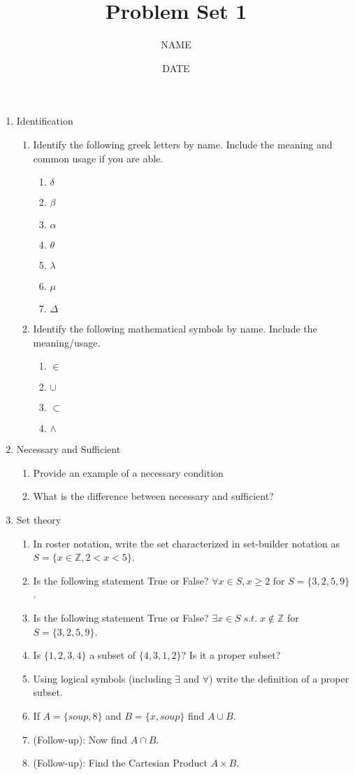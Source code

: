 \documentclass[12pt,thmsa]{article}
\title{Problem Set 1}
\author{NAME}
\date{DATE}
\begin{document}
\maketitle


\begin{enumerate}
\item Identification
\begin{enumerate}
\item Identify the following greek letters by name. Include the meaning and common usage if you are able. 
\begin{enumerate}
\item $\delta$
\item $\beta$
\item $\alpha$
\item $\theta$
\item $\lambda$
\item $\mu$
\item $\Delta$
\end{enumerate}

\item Identify the following mathematical symbols by name. Include the meaning/usage. 
\begin{enumerate}
\item $\in$
\item $\cup$
\item $\subset$
\item $\wedge$
\end{enumerate}
\end{enumerate}

\item Necessary and Sufficient
\begin{enumerate}
\item Provide an example of a necessary condition 
\item What is the difference between necessary and sufficient?
\end{enumerate}

\item Set theory
\begin{enumerate}
\item In roster notation, write the set characterized in set-builder notation as $S = \{x \in \mathbb{Z}, 2 <x <5\}$.
\item Is the following statement True or False? $\forall x \in S, x\geq 2$ for $S = \{3,2,5,9\}$.
\item Is the following statement True or False? $\exists x \in S\; s.t. \; x \notin \mathbb{Z}$ for $S = \{3,2,5,9\}$.
\item Is $\{1,2,3,4\}$ a subset of $\{4,3,1,2\}$? Is it a proper subset?
\item Using logical symbols (including $\exists$ and $\forall$) write the definition of a proper subset.
\item If $A = \{soup, 8\}$ and $B = \{x, soup\}$ find $A \cup B$.
\item (Follow-up): Now find $A \cap B$.
\item (Follow-up): Find the Cartesian Product $A \times B$.
\end{enumerate}


\end{enumerate}
\end{document}
